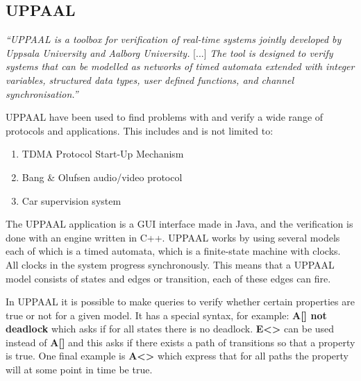 \subsection{UPPAAL}\label{subsec:uppaal}
\begin{tcolorbox}[floatplacement=b,float,colback=white!5,colframe=aaublue!50,title=What is UPPAAL \cite{tutorial04}?]
\textit{``UPPAAL is a toolbox for verification of real-time systems jointly developed by Uppsala University and Aalborg University.} [...] \textit{The tool is designed to verify systems that can be modelled as networks of timed automata extended with integer variables, structured data types, user defined functions, and channel synchronisation.''}
\end{tcolorbox} 

UPPAAL have been used to find problems with and verify a wide range of protocols and applications. 
This includes and is not limited to: 
\begin{enumerate}[label=\itshape \alph*\upshape)]
    \item TDMA Protocol Start-Up Mechanism \cite{Lonn:1997:FVT:826040.827011}
    \item Bang \& Olufsen audio/video protocol \cite{Havelund97formalmodeling}
    \item Car supervision system \cite{gebremichael2004formal}
\end{enumerate}
The UPPAAL application is a GUI interface made in Java, and the verification is done with an engine written in C++. 
UPPAAL works by using several models each of which is a timed automata, which is a finite-state machine with clocks. 
All clocks in the system progress synchronously. 
This means that a UPPAAL model consists of states and edges or transition, each of these edges can fire. 

In UPPAAL it is possible to make queries to verify whether certain properties are true or not for a given model.
It has a special syntax, for example: \textbf{A[] not deadlock} which asks if for all states there is no deadlock.
\textbf{E<>} can be used instead of \textbf{A[]} and this asks if there exists a path of transitions so that a property is true.
One final example is \textbf{A<>} which express that for all paths the property will at some point in time be true.
